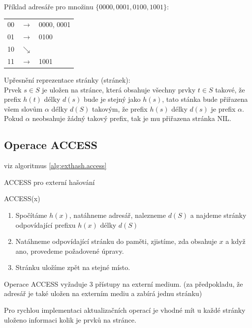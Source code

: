 \begin{priklad}
Příklad adresáře pro množinu $\{0000, 0001, 0100, 1001 \}$:

\vspace{5mm}

\begin{tabular}{lll}
00 & $\rightarrow$ & 0000, 0001 \\
01 & $\rightarrow$ & 0100 \\
\hline
10 & $\searrow$ & \\
11 & $\rightarrow$ & 1001 \\
\end{tabular}
\end{priklad}

\begin{pozn}
Upřesnění reprezentace stránky (stránek): \\
Prvek $s \in S$ je uložen na stránce, která obsahuje všechny prvky $t \in
S$ takové, že prefix $h(t)$ délky $d(s)$ bude je stejný jako $h(s)$, tato stánka
bude přiřazena všem slovům $\alpha$ délky $d(S)$ takovým, že prefix $h(s)$ délky
$d(s)$ je prefix $\alpha$. \\
Pokud $\alpha$ neobsahuje žádný takový prefix, tak je mu přiřazena stránka
NIL.
\end{pozn}

\subsection{Operace ACCESS}

viz algoritmus \ref{alg:exthash.access}

\begin{algorithm}[!htb]
\caption{ACCESS pro externí hašování}
\label{alg:exthash.access}
ACCESS(x)
\begin{enumerate}
\item Spočítáme $h(x)$, natáhneme adresář, nalezneme $d(S)$ a najdeme
stránky odpovídající prefixu $h(x)$ délky $d(S)$
\item Natáhneme odpovídající stránku do paměti, zjistíme, zda obsahuje $x$ a
když ano, provedeme požadovené úpravy.
\item Stránku uložíme zpět na stejné místo.
\end{enumerate}
\end{algorithm}

Operace ACCESS vyžaduje 3 přístupy na externí medium. (za předpokladu, že
adresář je také uložen na externím mediu a zabírá jednu stránku) 

Pro rychlou implementaci aktualizačních operací je vhodné mít u každé
stránky uloženo informaci kolik je prvků na stránce.


